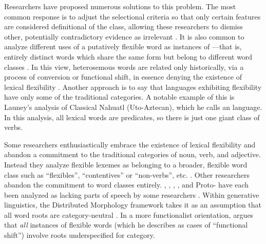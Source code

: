 Researchers have proposed numerous solutions to this problem. The most common response is to adjust the selectional criteria so that only certain features are considered definitional of the class, allowing these researchers to dismiss other, potentially contradictory evidence as irrelevant . It is also common to analyze different uses of a putatively flexible word as instances of —that is, entirely distinct words which share the same form but belong to different word classes \parencite{Lichtenberk1991}. In this view, heterosemous words are related only historically, via a process of conversion or functional shift, in essence denying the existence of lexical flexibility \parencite{EvansOsada2005}. Another approach is to say that languages exhibiting flexibility have only some of the traditional categories. A notable example of this is Launey's \parencites*{Launey1994}{Launey2004} analysis of Classical Nahuatl (Uto-Aztecan), which he calls an  language. In this analysis, all lexical words are predicates, so there is just one giant class of verbs.

Some researchers enthusiastically embrace the existence of lexical flexibility and abandon a commitment to the traditional categories of noun, verb, and adjective. Instead they analyze flexible lexemes as belonging to a broader, flexible word class such as \enquote{flexibles}, \enquote{contentives} or \enquote{non-verbs}, etc. \parencites{HengeveldRijkhoff2005}{Luuk2010}. Other researchers abandon the commitment to word classes entirely. , , , , and Proto- have each been analyzed as lacking parts of speech by some researchers . Within generative linguistics, the Distributed Morphology framework takes it as an assumption that all word roots are category-neutral \parencite{Siddiqi2018}. In a more functionalist orientation, \textcite{Farrell2001} argues that \emph{all} instances of flexible words (which he describes as cases of \enquote{functional shift}) involve roots underspecified for category.

